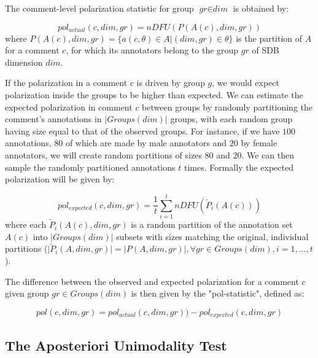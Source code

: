 \documentclass{article}
\newcommand{\sdbdim}{\textit{dim}}
\newcommand{\sdbgroup}{\textit{gr}}
\newcommand{\Sdbgroup}{\textit{Groups}}
\begin{document}
 The comment-level polarization statistic for group $\sdbgroup \in \sdbdim$ is obtained by:
 
 \begin{equation}
 	pol_{actual}(c, \sdbdim, \sdbgroup) = nDFU(P(A(c), \sdbdim, \sdbgroup))
 \end{equation}
 \noindent where $P(A(c),\sdbdim, \sdbgroup) = \{a(c, \theta) \in A | (\sdbdim, \sdbgroup) \in \theta\}$ is the partition of $A$ for a comment $c$, for which its annotators belong  to the group $\sdbgroup$ of \ac{SDB} dimension $\sdbdim$.
 
 If the polarization in a comment $c$ is driven by group $g$, we would expect polarization inside the groups to be higher than expected. We can estimate the expected polarization in comment $c$ between groups by randomly partitioning the comment's annotations in $\lvert \Sdbgroup(\sdbdim) \rvert$ groups, with each random group having size equal to that of the observed groups. For instance, if we have $100$ annotations, $80$ of which are made by male annotators and $20$ by female annotators, we will create random partitions of sizes $80$ and $20$. We can then sample the randomly partitioned annotations $t$ times. Formally the expected polarization will be given by:
 
 \begin{equation}
 	\label{eq:pol_expected}
 	pol_{expected}(c, \sdbdim, \sdbgroup) = \frac{1}{t} \sum_{i=1}^t  nDFU(\tilde{P}_i(A(c)))
 \end{equation}
 \noindent where each $\tilde{P}_i(A(c), \sdbdim, \sdbgroup)$ is a random partition of the annotation set $A(c)$ into $\lvert \Sdbgroup(\sdbdim) \rvert$ subsets with sizes matching the original, individual partitions ($\lvert \tilde{P}_i(A, \sdbdim, \sdbgroup) \rvert = \lvert P(A, \sdbdim, \sdbgroup) \rvert, \forall \sdbgroup \in \Sdbgroup(\sdbdim) , i=1, \ldots, t$).
 
 The difference between the observed and expected polarization for a comment $c$ given group $\sdbgroup \in \Sdbgroup(\sdbdim)$ is then given by the "pol-statistic", defined as: 
 
 \begin{equation}
	\textit{pol}(c, \sdbdim, \sdbgroup)  = pol_{actual}(c, \sdbdim, \sdbgroup)) - pol_{expected}(c, \sdbdim, \sdbgroup)
\end{equation}



\subsection{The Aposteriori Unimodality Test}
\label{ssec:methodology:aposteriori}
\end{document}
